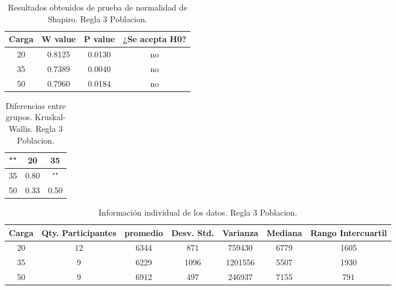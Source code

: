 \documentclass{article}
\begin{document}
\begin{table}[ht]
    \centering
    \caption{Resultados obtenidos de prueba de normalidad de Shapiro. Regla 3 Poblacion.} 
    \begin{tabular}{|c|c|c|c|}
    \hline
    Carga & W value & P value & ¿Se acepta H0?  \\
    \hline
    20 & 0.8125 & 0.0130 & no \\
    \hline 
     35 & 0.7389 & 0.0040 &  no \\
    \hline 
    50 & 0.7960 & 0.0184 & no \\
    \hline 
\end{tabular}
    \label{cuadro 25}
\end{table}

\begin{table}[htb]
    \centering
    \caption{Diferencias entre grupos. Kruskal-Wallis. Regla 3 Poblacion.} 
    \begin{tabular}{|c|c|c|}
    \hline
    "" & 20 & 35 \\
    \hline
    35 & 0.80 & ""  \\
    \hline
    50 & 0.33 & 0.50  \\
    \hline
\end{tabular}
    \label{cuadro 26}
\end{table}

\begin{table}[htb]
    \centering
    \caption{Informaci\'on individual de los datos. Regla 3 Poblacion.} 
    \begin{tabular}{|c|c|c|c|c|c|c|}
    \hline
    Carga & Qty. Participantes & promedio & Desv. Std. & Varianza & Mediana & Rango Intercuartil  \\
    \hline
    20 & 12 & 6344 & 871 & 759430 & 6779 & 1605 \\
    \hline
    35 & 9 & 6229 & 1096 & 1201556 & 5507 & 1930 \\
    \hline
    50 & 9 & 6912 & 497 & 246937 & 7155 & 791 \\
    \hline
\end{tabular}
    \label{cuadro 27}
\end{table}
\end{document}
